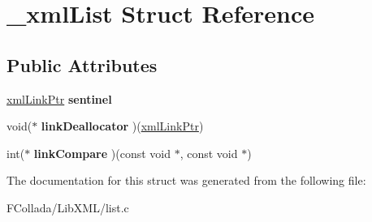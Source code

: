 \hypertarget{struct__xmlList}{
\section{\_\-xmlList Struct Reference}
\label{struct__xmlList}
}
\subsection*{Public Attributes}
\begin{DoxyCompactItemize}
\item 
\hypertarget{struct__xmlList_a8ac9209901e59674b432b6624794526a}{
\hyperlink{struct__xmlLink}{xmlLinkPtr} {\bfseries sentinel}}
\label{struct__xmlList_a8ac9209901e59674b432b6624794526a}

\item 
\hypertarget{struct__xmlList_a21237ca0a0b1c3e428e2574e5f1d4f82}{
void($\ast$ {\bfseries linkDeallocator} )(\hyperlink{struct__xmlLink}{xmlLinkPtr})}
\label{struct__xmlList_a21237ca0a0b1c3e428e2574e5f1d4f82}

\item 
\hypertarget{struct__xmlList_ae8fb1fdfe8408d47227fdfefe03a7e0e}{
int($\ast$ {\bfseries linkCompare} )(const void $\ast$, const void $\ast$)}
\label{struct__xmlList_ae8fb1fdfe8408d47227fdfefe03a7e0e}

\end{DoxyCompactItemize}


The documentation for this struct was generated from the following file:\begin{DoxyCompactItemize}
\item 
FCollada/LibXML/list.c\end{DoxyCompactItemize}
